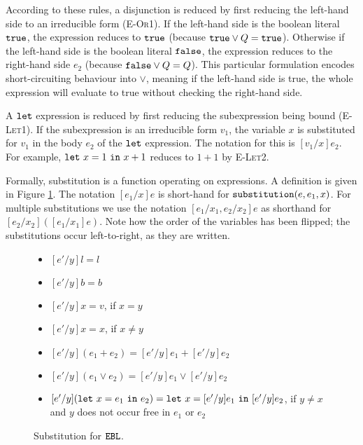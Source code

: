 According to these rules, a disjunction is reduced by first reducing the left-hand side to an irreducible form (\textsc{E-Or1}). If the left-hand side is the boolean literal $\mathtt{true}$, the expression reduces to $\mathtt{true}$ (because $\mathtt{true} \lor Q = \mathtt{true}$). Otherwise if the left-hand side is the boolean literal $\mathtt{false}$, the expression reduces to the right-hand side $e_2$ (because $\mathtt{false} \lor Q = Q$). This particular formulation encodes short-circuiting behaviour into $\lor$, meaning if the left-hand side is true, the whole expression will evaluate to true without checking the right-hand side.

A $\mathtt{let}$ expression is reduced by first reducing the subexpression being bound (\textsc{E-Let1}). If the subexpression is an irreducible form $v_1$, the variable $x$ is substituted for $v_1$ in the body $e_2$ of the $\mathtt{let}$ expression. The notation for this is $[v_1/x]e_2$. For example, $\mathtt{let}~ x = 1~\mathtt{in}~ x+1$ reduces to $1+1$ by \textsc{E-Let2}.

Formally, substitution is a function operating on expressions. A definition is given in Figure \ref{fig:ebl_sub_defn}. The notation $[e_1/x]e$ is short-hand for $\mathtt{substitution}(e, e_1, x)$. For multiple substitutions we use the notation $[e_1/x_1, e_2/x_2] e$ as shorthand for $[e_2/x_2]([e_1/x_1] e)$. Note how the order of the variables has been flipped; the substitutions occur left-to-right, as they are written.

\begin{figure}[h]


\begin{itemize}
	\setlength\itemsep{-0.7em}
	\item[] $[e'/y]l = l$
	\item[] $[e'/y]b = b$ 
	\item[] $[e'/y]x =  v$, if $x = y$
	\item[] $[e'/y]x = x$, if $x \neq y$
	\item[] $[e'/y](e_1 + e_2) = [e'/y]e_1 + [e'/y]e_2$
	\item[] $[e'/y](e_1 \lor e_2) = [e'/y]e_1 \lor [e'/y]e_2$
	\item[] $[e'/y](\mathtt{let}~ x = e_1~\mathtt{in}~ e_2) = \mathtt{let}~ x = [e'/y]e_1~\mathtt{in}~ [e'/y]e_2$, if $y \neq x$ and $y$ does not occur free in $e_1$ or $e_2$
\end{itemize}

\vspace{-12pt}
\caption{Substitution for $\mathtt{EBL}$.}
\label{fig:ebl_sub_defn}
\end{figure}

